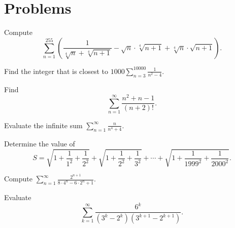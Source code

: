\documentclass[mast]{lucky}
\begin{document}
\pagebreak

\section{Problems}



\begin{prob}[TrinMaC 2020/14]{2}
Compute \[\sum\limits_{n=1}^{255}\left(\frac{1}{\sqrt[4]{n}+\sqrt[4]{n+1}}-\sqrt{n}\cdot \sqrt[4]{n+1}+\sqrt[4]{n}\cdot \sqrt{n+1}\right).\]
\end{prob}

\begin{prob}[AIME II 2002/6]{2}
Find the integer that is closest to $1000\sum\limits_{n=3}^{10000}\frac{1}{n^2-4}$.
\end{prob}


\begin{prob}[Alcumus]{2}
Find \[\sum_{n = 1}^\infty \frac{n^2 + n - 1}{(n + 2)!}.\]
\end{prob}


\begin{req}[HMMT 2008]{3}
Evaluate the infinite sum $\sum\limits_{n=1}^{\infty}\frac{n}{n^4+4}$.
\end{req}


\begin{prob}[USAMTS 1999]{3}
Determine the value of
\[S=\sqrt{1+\frac{1}{1^2}+\frac{1}{2^2}}+\sqrt{1+\frac{1}{2^2}+\frac{1}{3^2}}+\cdots+\sqrt{1+\frac{1}{1999^2}+\frac{1}{2000^2}}.\]
\end{prob}


\begin{prob}[CHMMC 2016/4]{3}
Compute $\sum\limits_{n=1}^{\infty} \frac{2^{n+1}}{8\cdot 4^n-6\cdot 2^n+1}.$
\end{prob}

\begin{prob}[]{4}
Evaluate \[\sum\limits_{k=1}^{\infty} \frac{6^k}{(3^k-2^k)(3^{k+1}-2^{k+1})}.\]
\end{prob}
\end{document}
